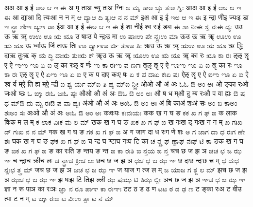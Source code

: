 \documentclass{article}
\begin{document}
\card
{अ}{अ आ इ ई}%
{ಅ}{ಅ ಆ ಇ ಈ}
{{अ मृ ता}{अ च्यु तः}{अ ग्निः}}%
{{ಅ ಮೃ ತಾ}{ಅ ಚ್ಯು ತಃ}{ಅ ಗ್ನಿಃ}}
\card
{आ}{अ आ इ ई}%
{ಆ}{ಅ ಆ ಇ ಈ}
{{आ द्या}{आ दि त्यः}{आ न न म्}}%
{{ಆ ದ್ಯಾ}{ಆ ದಿ ತ್ಯಃ}{ಆ ನ ನ ಮ್}}
\card
{इ}{अ आ इ ई}%
{ಇ}{ಅ ಆ ಇ ಈ}
{{इ न्द्रा णी}{इ ज्यः}{इ डा}}%
{{ಇ ನ್ದ್ರಾ ಣೀ}{ಇ ಜ್ಯಃ}{ಇ ಡಾ}}
\card
{ई}{अ आ इ ई}%
{ಈ}{ಅ ಆ ಇ ಈ}
{{ई शा नी}{ई श्व रः}{ई ड्यः}}%
{{ಈ ಶಾ ನೀ}{ಈ ಶ್ವ ರಃ}{ಈ ಡ್ಯಃ}}
\card
{उ}{उ ऊ ऋ ॠ}%
{ಉ}{ಉ ಊ ಋ ೠ}
{{उ षाः}{उ पे न्द्रः}{उ मा}}%
{{ಉ ಷಾಃ}{ಉ ಪೇ ನ್ದ್ರಃ}{ಉ ಮಾ}}
\card
{ऊ}{उ ऊ ऋ ॠ}%
{ಊ}{ಉ ಊ ಋ ೠ}
{{ऊ र्ध्वा}{ऊ र्जि तः}{ऊ तिः}}%
{{ಊ ರ್ಧ್ವಾ}{ಊ ರ್ಜಿ ತಃ}{ಊ ತಿಃ}}
\card
{ऋ}{उ ऊ ऋ ॠ}%
{ಋ}{ಉ ಊ ಋ ೠ}
{{ऋ द्धि दा}{ऋ तुः}{ऋ क्}}%
{{ಋ ದ್ಧಿ ದಾ}{ಋ ತುಃ}{ಋ ಕ್}}
\card
{ॠ}{उ ऊ ऋ ॠ}%
{ೠ}{ಉ ಊ ಋ ೠ}
{{ॠ का रः}{ }{ }}%
{{ೠ ಕಾ ರಃ}{ }{ }}
\card
{ऌ}{ऌ ॡ ए ऐ}%
{ಌ}{ಌ ೡ ಏ ಐ}
{{ऌ का रः}{ऌ व र्णः}{ }}%
{{ಌ ಕಾ ರಃ}{ಌ ವ ರ್ಣಃ}{ }}
\card
{ॡ}{ऌ ॡ ए ऐ}%
{ೡ}{ಌ ೡ ಏ ಐ}
{{ॡ का रः}{ }{ }}%
{{ೡ ಕಾ ರಃ}{ }{ }}
\card
{ए}{ऌ ॡ ए ऐ}%
{ಏ}{ಌ ೡ ಏ ಐ}
{{ए क प दा}{ए कः}{ए षः}}%
{{ಏ ಕ ಪ ದಾ}{ಏ ಕಃ}{ಏ ಷಃ}}
\card
{ऐ}{ऌ ॡ ए ऐ}%
{ಐ}{ಌ ೡ ಏ ಐ}
{{ऐ श्व र्य म्}{ऐ ति ह्य म्}{ऐ न्द्री}}%
{{ಐ ಶ್ವ ರ್ಯ ಮ್}{ಐ ತಿ ಹ್ಯ ಮ್}{ಐ ನ್ದ್ರೀ}}
\card
{ओ}{ओ औ अं अः}%
{ಓ}{ಓ ಔ ಅಂ ಅಃ}
{{ओ ङ्का रः}{ओ जः}{ओ ष्ठः}}%
{{ಓ ಙ್ಕಾ ರಃ}{ಓ ಜಃ}{ಓ ಷ್ಠಃ}}
\card
{औ}{ओ औ अं अः}%
{ಔ}{ಓ ಔ ಅಂ ಅಃ}
{{औ ष ध म्}{औ दु म्ब रः}{औ प वा ह्यः}}%
{{ಔ ಷ ಧ ಮ್}{ಔ ದು ಮ್ಬ ರಃ}{ಔ ಪ ವಾ ಹ್ಯಃ}}
\card
{अं}{ओ औ अं अः}%
{ಅಂ}{ಓ ಔ ಅಂ ಅಃ}
{{अं बि का}{अं शः}{अं सः}}%
{{ಅಂ ಬಿ ಕಾ}{ಅಂ ಶಃ}{ಅಂ ಸಃ}}
\card
{अः}{ओ औ अं अः}%
{ಅಃ}{ಓ ಔ ಅಂ ಅಃ}
{{कः}{वः}{यः}}%
{{ಕಃ}{ವಃ}{ಯಃ}}
\card
{क}{क ख ग घ ङ}%
{ಕ}{ಕ ಖ ಗ ಘ ಙ}
{{क ला}{क विः}{क म ल म्}}%
{{ಕ ಲಾ}{ಕ ವಿಃ}{ಕ ಮ ಲ ಮ್}}
\card
{ख}{क ख ग घ ङ}%
{ಖ}{ಕ ಖ ಗ ಘ ಙ}
{{ख गः}{ख ड् गः}{ख न न म्}}%
{{ಖ ಗಃ}{ಖ ಡ್ ಗಃ}{ಖ ನ ನ ಮ್}}
\card
{ग}{क ख ग घ ङ}%
{ಗ}{ಕ ಖ ಗ ಘ ಙ}
{{अ ग जा}{ग दा ध रः}{ग णे शः}}%
{{ಅ ಗ ಜಾ}{ಗ ದಾ ಧ ರಃ}{ಗ ಣೇ ಶಃ}}
\card
{घ}{क ख ग घ ङ}%
{ಘ}{ಕ ಖ ಗ ಘ ಙ}
{{च न्द्र घ ण्टा}{घ नः}{घ टि का}}%
{{ಚ ನ್ದ್ರ ಘ ಣ್ಟಾ}{ಘ ನಃ}{ಘ ಟಿ ಕಾ}}
\card
{ङ}{क ख ग घ ङ}%
{ಙ}{ಕ ಖ ಗ ಘ ಙ}
{{ङ का रः}{ति ङ न्त}{य ङ न्त}}%
{{ಙ ಕಾ ರಃ}{ತಿ ಙ ನ್ತ}{ಯ ಙ ನ್ತ}}
\card
{च}{च छ ज झ ञ}%
{ಚ}{ಚ ಛ ಜ ಝ ಞ}
{{च न्द्रा}{च क्री}{च लः}}%
{{ಚ ನ್ದ್ರಾ}{ಚ ಕ್ರೀ}{ಚ ಲಃ}}
\card
{छ}{च छ ज झ ञ}%
{ಛ}{ಚ ಛ ಜ ಝ ಞ}
{{छ दः}{छ न्दः}{छ त्त्र म्}}%
{{ಛ ದಃ}{ಛ ನ್ದಃ}{ಛ ತ್ತ್ರ ಮ್}}
\card
{ज}{च छ ज झ ञ}%
{ಜ}{ಚ ಛ ಜ ಝ ಞ}
{{ज या}{ज ग त्}{ज ल म्}}%
{{ಜ ಯಾ}{ಜ ಗ ತ್}{ಜ ಲ ಮ್}}
\card
{झ}{च छ ज झ ञ}%
{ಝ}{ಚ ಛ ಜ ಝ ಞ}
{{झ षः}{झ टि ति}{झ ल्ली}}%
{{ಝ ಷಃ}{ಝ ಟಿ ತಿ}{ಝ ಲ್ಲೀ}}
\card
{ञ}{च छ ज झ ञ}%
{ಞ}{ಚ ಛ ಜ ಝ ಞ}
{{ज्ञा न रू पा}{ञ का रः}{ञः}}%
{{ಜ್ಞಾ ನ ರೂ ಪಾ}{ಞ ಕಾ ರಃ}{ಞಃ}}
\card
{ट}{ट ठ ड ढ ण}%
{ಟ}{ಟ ಠ ಡ ಢ ಣ}
{{ट ङ्का रः}{अ ट वी}{उ त्पा ट न म्}}%
{{ಟ ಙ್ಕಾ ರಃ}{ಅ ಟ ವೀ}{ಉ ತ್ಪಾ ಟ ನ ಮ್}}
\end{document}
